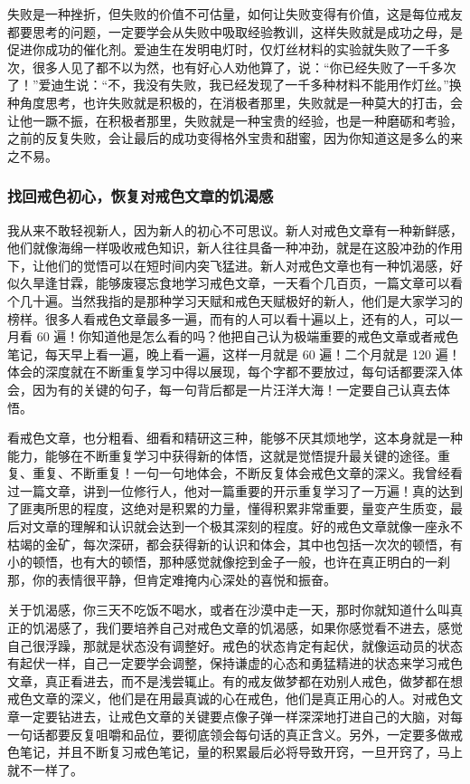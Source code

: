失败是一种挫折，但失败的价值不可估量，如何让失败变得有价值，这是每位戒友都要思考的问题，一定要学会从失败中吸取经验教训，这样失败就是成功之母，是促进你成功的催化剂。爱迪生在发明电灯时，仅灯丝材料的实验就失败了一千多次，很多人见了都不以为然，也有好心人劝他算了，说：“你已经失败了一千多次了！”爱迪生说：“不，我没有失败，我已经发现了一千多种材料不能用作灯丝。”换种角度思考，也许失败就是积极的，在消极者那里，失败就是一种莫大的打击，会让他一蹶不振，在积极者那里，失败就是一种宝贵的经验，也是一种磨砺和考验，之前的反复失败，会让最后的成功变得格外宝贵和甜蜜，因为你知道这是多么的来之不易。

\subsubsection{找回戒色初心，恢复对戒色文章的饥渴感}

我从来不敢轻视新人，因为新人的初心不可思议。新人对戒色文章有一种新鲜感，他们就像海绵一样吸收戒色知识，新人往往具备一种冲劲，就是在这股冲劲的作用下，让他们的觉悟可以在短时间内突飞猛进。新人对戒色文章也有一种饥渴感，好似久旱逢甘霖，能够废寝忘食地学习戒色文章，一天看个几百页，一篇文章可以看个几十遍。当然我指的是那种学习天赋和戒色天赋极好的新人，他们是大家学习的榜样。很多人看戒色文章最多一遍，而有的人可以看十遍以上，还有的人，可以一月看 60 遍！你知道他是怎么看的吗？他把自己认为极端重要的戒色文章或者戒色笔记，每天早上看一遍，晚上看一遍，这样一月就是 60 遍！二个月就是 120 遍！体会的深度就在不断重复学习中得以展现，每个字都不要放过，每句话都要深入体会，因为有的关键的句子，每一句背后都是一片汪洋大海！一定要自己认真去体悟。

看戒色文章，也分粗看、细看和精研这三种，能够不厌其烦地学，这本身就是一种能力，能够在不断重复学习中获得新的体悟，这就是觉悟提升最关键的途径。重复、重复、不断重复！一句一句地体会，不断反复体会戒色文章的深义。我曾经看过一篇文章，讲到一位修行人，他对一篇重要的开示重复学习了一万遍！真的达到了匪夷所思的程度，这绝对是积累的力量，懂得积累非常重要，量变产生质变，最后对文章的理解和认识就会达到一个极其深刻的程度。好的戒色文章就像一座永不枯竭的金矿，每次深研，都会获得新的认识和体会，其中也包括一次次的顿悟，有小的顿悟，也有大的顿悟，那种感觉就像挖到金子一般，也许在真正明白的一刹那，你的表情很平静，但肯定难掩内心深处的喜悦和振奋。

关于饥渴感，你三天不吃饭不喝水，或者在沙漠中走一天，那时你就知道什么叫真正的饥渴感了，我们要培养自己对戒色文章的饥渴感，如果你感觉看不进去，感觉自己很浮躁，那就是状态没有调整好。戒色的状态肯定有起伏，就像运动员的状态有起伏一样，自己一定要学会调整，保持谦虚的心态和勇猛精进的状态来学习戒色文章，真正看进去，而不是浅尝辄止。有的戒友做梦都在劝别人戒色，做梦都在想戒色文章的深义，他们是在用最真诚的心在戒色，他们是真正用心的人。对戒色文章一定要钻进去，让戒色文章的关键要点像子弹一样深深地打进自己的大脑，对每一句话都要反复咀嚼和品位，要彻底领会每句话的真正含义。另外，一定要多做戒色笔记，并且不断复习戒色笔记，量的积累最后必将导致开窍，一旦开窍了，马上就不一样了。

